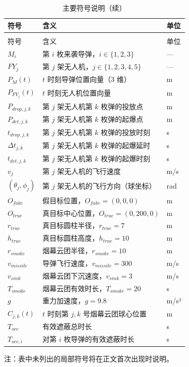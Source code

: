 \begin{longtable}{>{\centering\arraybackslash}p{}>{\raggedright\arraybackslash}p{}>{\centering\arraybackslash}p{}}
  \caption{主要符号说明} \label{tab:symbols} \\
  \toprule
  符号 & 含义 & 单位 \\
  \midrule
  \endfirsthead
  \caption{主要符号说明（续）} \\
  \toprule
  符号 & 含义 & 单位 \\
  \midrule
  \endhead
  \bottomrule
  \endfoot
  $M_i$ & 第 $i$ 枚来袭导弹，$i \in \{1, 2, 3\}$ & — \\
  $FY_j$ & 第 $j$ 架无人机，$j \in \{1, 2, 3, 4, 5\}$ & — \\
  $P_M(t)$ & $t$ 时刻导弹位置向量（3 维） & m \\
  $P_{FY_j}(t)$ & $t$ 时刻无人机位置向量 & m \\
  $P_{drop,j,k}$ & 第 $j$ 架无人机第 $k$ 枚弹的投放点 & m \\
  $P_{det,j,k}$ & 第 $j$ 架无人机第 $k$ 枚弹的起爆点 & m \\
  $t_{drop,j,k}$ & 第 $j$ 架无人机第 $k$ 枚弹的投放时刻 & s \\
  $\Delta t_{j,k}$ & 第 $j$ 架无人机第 $k$ 枚弹的起爆延时 & s \\
  $t_{det,j,k}$ & 第 $j$ 架无人机第 $k$ 枚弹的起爆时刻 & s \\
  $v_j$ & 第 $j$ 架无人机的飞行速度 & m/s \\
  $(\theta_j, \phi_j)$ & 第 $j$ 架无人机的飞行方向（球坐标） & rad \\
  $O_{fake}$ & 假目标位置，$O_{fake} = (0, 0, 0)$ & m \\
  $O_{true}$ & 真目标中心位置，$O_{true} = (0, 200, 0)$ & m \\
  $r_{true}$ & 真目标圆柱半径，$r_{true} = 7$ & m \\
  $h_{true}$ & 真目标圆柱高度，$h_{true} = 10$ & m \\
  $r_{smoke}$ & 烟幕云团半径，$r_{smoke} = 10$ & m \\
  $v_{missile}$ & 导弹飞行速度，$v_{missile} = 300$ & m/s \\
  $v_{sink}$ & 烟幕云团下沉速度，$v_{sink} = 3$ & m/s \\
  $T_{smoke}$ & 烟幕云团有效时长，$T_{smoke} = 20$ & s \\
  $g$ & 重力加速度，$g = 9.8$ & m/s² \\
  $C_{j,k}(t)$ & $t$ 时刻第 $j,k$ 号烟幕云团球心位置 & m \\
  $T_{occ}$ & 有效遮蔽总时长 & s \\
  $T_{occ,i}$ & 对第 $i$ 枚导弹的有效遮蔽时长 & s \\
\end{longtable}

注：表中未列出的局部符号将在正文首次出现时说明。
